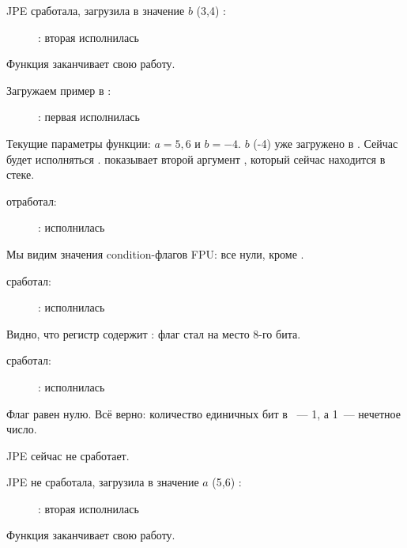 \clearpage
\ac{JPE} сработала, \FLD загрузила в  значение $b$ (3,4)%
:

\begin{figure}[H]
\centering
{}
\caption{\olly: вторая \FLD исполнилась}
\label{fig:FPU_comparison_case1_olly5}
\end{figure}

Функция заканчивает свою работу.

\clearpage
{}

Загружаем пример в \olly:

\begin{figure}[H]
\centering
{}
\caption{\olly: первая \FLD исполнилась}
\label{fig:FPU_comparison_case2_olly1}
\end{figure}

Текущие параметры функции: $a=5,6$ и $b=-4$.
$b$ (-4) уже загружено в .
Сейчас будет исполняться \FCOMP. 
\olly показывает второй аргумент \FCOMP, который сейчас находится в стеке.


\clearpage
\FCOMP отработал:

\begin{figure}[H]
\centering
{}
\caption{\olly: \FCOMP исполнилась}
\label{fig:FPU_comparison_case2_olly2}
\end{figure}

Мы видим значения condition-флагов \ac{FPU}: все нули, кроме \Czero.


\clearpage
\FNSTSW сработал:

\begin{figure}[H]
\centering
{}
\caption{\olly: \FNSTSW исполнилась}
\label{fig:FPU_comparison_case2_olly3}
\end{figure}

Видно, что регистр  содержит : флаг \Czero стал на место 8-го бита.


\clearpage
\TEST сработал:

\begin{figure}[H]
\centering
{}
\caption{\olly: \TEST исполнилась}
\label{fig:FPU_comparison_case2_olly4}
\end{figure}

Флаг  равен нулю.
Всё верно: 
количество единичных бит в ~--- 1, а 1~--- нечетное число.

\ac{JPE} сейчас не сработает.

\clearpage
\ac{JPE} не сработала,  \FLD 
загрузила в  значение $a$ (5,6)%
:

\begin{figure}[H]
\centering
{}
\caption{\olly: вторая \FLD исполнилась}
\label{fig:FPU_comparison_case2_olly5}
\end{figure}

Функция заканчивает свою работу.
